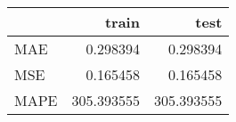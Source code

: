 \begin{tabular}{lrr}
\toprule
{} &       train &        test \\
\midrule
MAE  &    0.298394 &    0.298394 \\
MSE  &    0.165458 &    0.165458 \\
MAPE &  305.393555 &  305.393555 \\
\bottomrule
\end{tabular}

